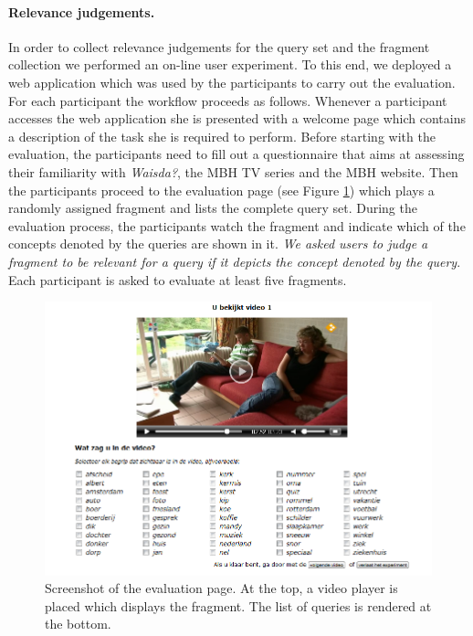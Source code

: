 \paragraph{\textbf{Relevance judgements.}}\label{sec:gold-standard}
In order to collect relevance judgements for the query set and the fragment collection we performed an on-line user experiment. To this end, we deployed a web application which was used by the participants to carry out the evaluation. %
For each participant the workflow proceeds as follows. Whenever a participant accesses the web application she is presented with a welcome page which contains a description of the task she is required to perform. Before starting with the evaluation, the participants need to fill out a questionnaire that aims at assessing their familiarity with \textit{Waisda?}, the MBH TV series and the MBH website. Then the participants proceed to the evaluation page (see Figure \ref{fig:evaluation-page}) which plays a randomly assigned fragment and lists the complete query set. During the evaluation process, the participants watch the fragment and indicate which of the concepts denoted by the queries are shown in it. \textit{We asked users to judge a fragment to be relevant for a query if it depicts the concept denoted by the query}. Each participant is asked to evaluate at least five fragments.
\begin{figure}
\centering
\includegraphics[scale=.5]{ecir:mendyvideo.PNG}
\caption{Screenshot of the evaluation page. At the top, a video player is placed which displays the fragment. The list of queries is rendered at the bottom.}
\label{fig:evaluation-page}
\end{figure}


